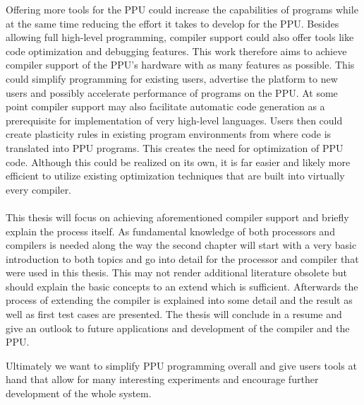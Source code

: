 Offering more tools for the PPU could increase the capabilities of programs while at the same time reducing the effort it takes to develop for the PPU.
Besides allowing full high-level programming, compiler support could also offer tools like code optimization and debugging features.
This work therefore aims to achieve compiler support of the PPU's hardware with as many features as possible.
This could simplify programming for existing users, advertise the platform to new users and possibly accelerate performance of programs on the PPU.
At some point compiler support may also facilitate automatic code generation as a prerequisite for implementation of very high-level languages.
Users then could create plasticity rules in existing program environments from where code is translated into PPU programs.
This creates the need for optimization of PPU code.
Although this could be realized on its own, it is far easier and likely more efficient to utilize existing optimization techniques that are built into virtually every compiler.
\\
\\
This thesis will focus on achieving aforementioned compiler support and briefly explain the process itself.
As fundamental knowledge of both processors and compilers is needed along the way the second chapter will start with a very basic introduction to both topics and go into detail for the processor and compiler that were used in this thesis.
This may not render additional literature obsolete but should explain the basic concepts to an extend which is sufficient.
Afterwards the process of extending the compiler is explained into some detail and the result as well as first test cases are presented.
The thesis will conclude in a resume and give an outlook to future applications and development of the compiler and the PPU.

Ultimately we want to simplify PPU programming overall and give users tools at hand that allow for many interesting experiments and encourage further development of the whole system.




